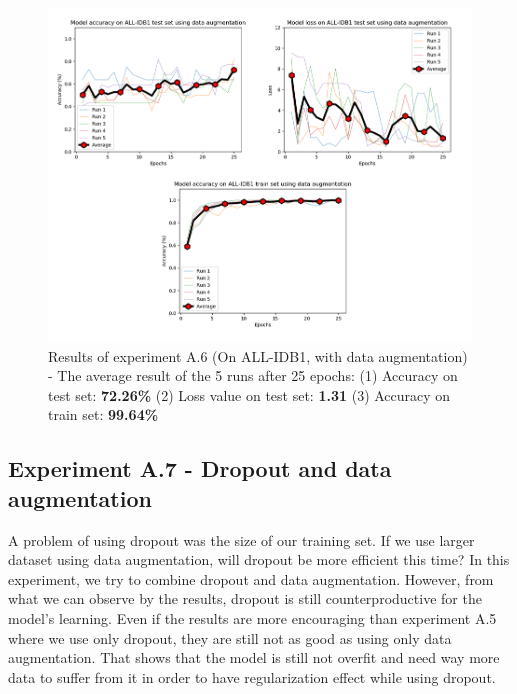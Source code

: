 \documentclass[11pt, openany]{report}
\theoremstyle{plain}
\theoremstyle{definition}
\theoremstyle{remark}
\begin{document}
\begin{figure}[H]
  \centering
  \includegraphics[scale=0.38]{Code/ch6-LeukemiaSubtypes/figures_result/ALL_IDB1/all_idb1-data_aug.PNG}
  \caption{Results of experiment A.6 (On ALL-IDB1, with data augmentation) - The average result of the 5 runs after 25 epochs: (1) Accuracy on test set: \textbf{72.26\%} (2) Loss value on test set: \textbf{1.31} (3) Accuracy on train set: \textbf{99.64\%}}
  \label{fig:results-A6}
\end{figure}

\newpage
\subsection{Experiment A.7 - Dropout and data augmentation} \label{sec:drop-dataaug-allidb1}
A problem of using dropout was the size of our training set. If we use larger dataset using data augmentation, will dropout be more efficient this time? In this experiment, we try to combine dropout and data augmentation. However, from what we can observe by the results, dropout is still counterproductive for the model's learning. Even if the results are more encouraging than experiment A.5 where we use only dropout, they are still not as good as using only data augmentation. That shows that the model is still not overfit and need way more data to suffer from it in order to have regularization effect while using dropout. 
\end{document}
